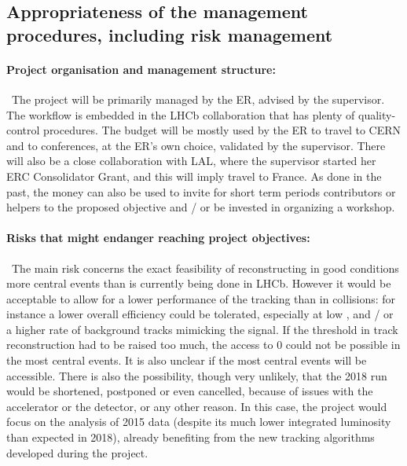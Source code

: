 \documentclass[a4paper,11pt]{article}
\newcommand{\ER}{ER\xspace}
\newcommand{\supervisor}{the supervisor\xspace}
\begin{document}
%            

\subsection{Appropriateness of the management procedures, including risk management }


\paragraph{Project organisation and management structure: }\
The project will be primarily managed by the \ER, advised by \supervisor. The workflow is embedded in the LHCb
collaboration that has plenty of quality-control procedures. The budget will be mostly used by the \ER to travel to
CERN and to conferences, at the \ER’s own choice, validated by \supervisor. There will also be a close collaboration with LAL, where \supervisor started her ERC Consolidator Grant, and this will imply travel to France. As done in the past,
the money can also be used to invite for short term periods contributors or helpers to the proposed objective and / or
be invested in organizing a workshop.



\paragraph{Risks that might endanger reaching project objectives: }\
The main risk concerns the exact feasibility of reconstructing in good conditions more central events than is currently being done in LHCb. However it would be acceptable to allow for a lower performance of the tracking than in \pp collisions: for instance a lower overall efficiency could be tolerated, especially at low \pt, and / or a higher rate of background tracks mimicking the signal. If the \pt threshold in track reconstruction had to be raised too much, the access to 0 \pt \Dz could not be possible in the most central events. It is also unclear if the most central events will be accessible. 
%
There is also the possibility, though very unlikely, that the 2018 \pbpb run would be shortened, postponed or even cancelled, because of issues with the accelerator or the detector, or any other reason. In this case, the project would focus on the analysis of 2015 \pbpb data (despite its much lower integrated luminosity than expected in 2018), already benefiting from the new tracking algorithms developed during the project.
\end{document}
